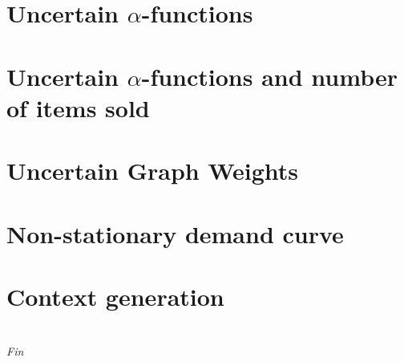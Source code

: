 \documentclass[11pt]{beamer}
\begin{document}
\section{Uncertain $\alpha$-functions}






\section{Uncertain $\alpha$-functions and number of items sold}






\section{Uncertain Graph Weights}






\section{Non-stationary demand curve}






\section{Context generation}





\section{}
\begin{frame}
\centering \Large
\textit{Fin}
\end{frame}
\end{document}
